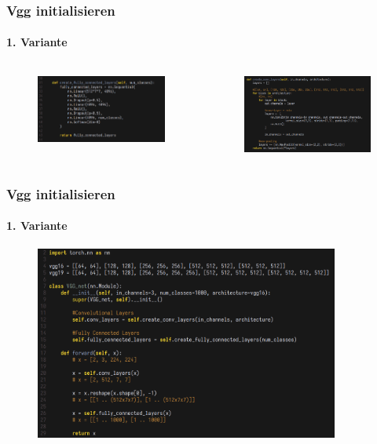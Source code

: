 \documentclass[10pt]{beamer}
\begin{document}
\begin{frame}
\frametitle{Vgg initialisieren}
\framesubtitle{1. Variante}
\begin{columns}
	\begin{column}{.5\textwidth}
		\begin{figure}
			\includegraphics[width=55mm]{init_fc.png}
		\end{figure}
	\end{column}
	\begin{column}{.5\textwidth}
		\begin{figure}
			\includegraphics[width=55mm]{init_c.png}
		\end{figure}
	\end{column}
\end{columns}
\end{frame}

\begin{frame}
\frametitle{Vgg initialisieren}
\framesubtitle{1. Variante}
	\begin{figure}
		\includegraphics[width=100mm]{init_main.png}
	\end{figure}
\end{frame}
\end{document}

